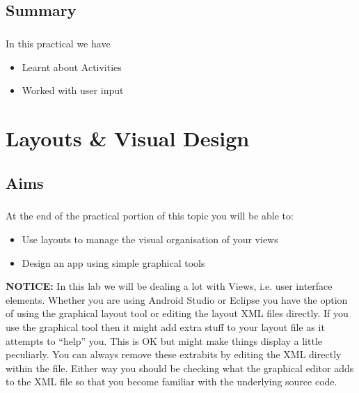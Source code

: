 \documentclass[12pt, a4paper, twoside]{book}
\begin{document}
\section{Summary}
\paragraph{} In this practical we have 

\begin{itemize}
\item Learnt about Activities
\item Worked with user input
\end{itemize}



\chapter{Layouts \& Visual Design}
\section{Aims}
\paragraph{} At the end of the practical portion of this topic you will be able to:

\begin{itemize}
\item Use layouts to manage the visual organisation of your views
\item Design an app using simple graphical tools
\end{itemize}


\begin{framed}
{\bf{NOTICE:}} In this lab we will be dealing a lot with Views, i.e. user interface elements. Whether you are using Android Studio or Eclipse you have the option of using the graphical layout tool or editing the layout XML files directly. If you use the graphical tool then it might add extra stuff to your layout file as it attempts to ``help'' you. This is OK but might make things display a little peculiarly. You can always remove these extrabits by editing the XML directly within the file. Either way you should be checking what the graphical editor adds to the XML file so that you become familiar with the underlying source code.
\end{framed}
\end{document}
